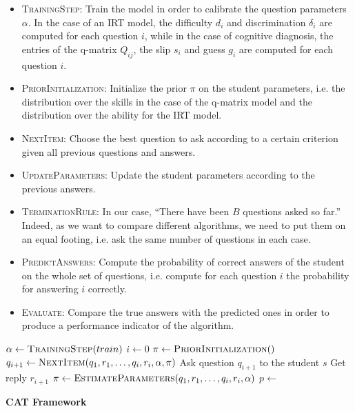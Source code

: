 \documentclass{sig-alternate}
\begin{document}
\begin{itemize}
\item \textsc{TrainingStep}: Train the model in order to calibrate the question parameters $\alpha$. In the case of an IRT model, the difficulty $d_i$ and discrimination $\delta_i$ are computed for each question $i$, while in the case of cognitive diagnosis, the entries of the q-matrix $Q_{ij}$, the slip $s_i$ and guess $g_i$ are computed for each question $i$.
\item \textsc{PriorInitialization}: Initialize the prior $\pi$ on the student parameters, i.e. the distribution over the skills in the case of the q-matrix model and the distribution over the ability for the IRT model. 
\item \textsc{NextItem}: Choose the best question to ask according to a certain criterion given all previous questions and answers. 
\item \textsc{UpdateParameters}: Update the student parameters according to the previous answers.
\item \textsc{TerminationRule}: In our case, ``There have been $B$ questions asked so far.'' Indeed, as we want to compare different algorithms, we need to put them on an equal footing, i.e. ask the same number of questions in each case.
\item \textsc{PredictAnswers}: Compute the probability of correct answers of the student on the whole set of questions, i.e. compute for each question $i$ the probability for answering $i$ correctly.
\item \textsc{Evaluate}: Compare the true answers with the predicted ones in order to produce a performance indicator of the algorithm. 
\end{itemize}

\begin{algorithm}
\begin{algorithmic}
\State $\alpha \gets \Call{TrainingStep}{train}$
\State $i \gets 0$
	\State $\pi \gets \Call{PriorInitialization}$
		\State $q_{i + 1} \gets \Call{NextItem}{q_1, r_1, \ldots, q_i, r_i, \alpha, \pi}$
		\State Ask question $q_{i + 1}$ to the student $s$
		\State Get reply $r_{i + 1}$
		\State $\pi \gets \Call{EstimateParameters}{q_1, r_1, \ldots, q_i, r_i, \alpha}$
	\EndWhile
	\State $p \gets$ 
	\State {}
\EndFor
\EndProcedure
\end{algorithmic}
\caption{\textbf{CAT Framework}}
\end{algorithm}
\end{document}
